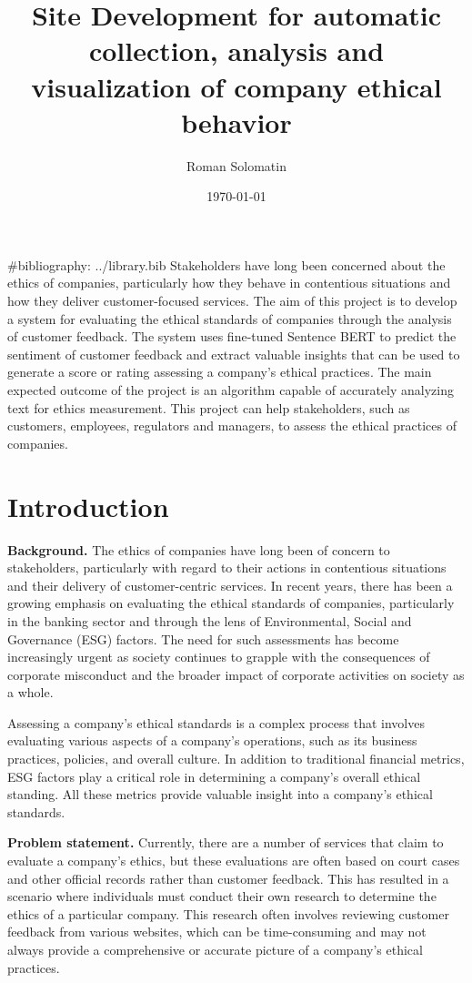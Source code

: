 \documentclass[PI]{ProjectProposal}
\author{Roman Solomatin}
\date{\today}
\title{Site Development for automatic collection, analysis and visualization of company ethical behavior}
\begin{document}
\maketitle
\#bibliography: ../library.bib
Stakeholders have long been concerned about the ethics of companies, particularly how they behave in contentious situations and how they deliver customer-focused services. The aim of this project is to develop a system for evaluating the ethical standards of companies through the analysis of customer feedback. The system uses fine-tuned Sentence BERT to predict the sentiment of customer feedback and extract valuable insights that can be used to generate a score or rating assessing a company's ethical practices. The main expected outcome of the project is an algorithm capable of accurately analyzing text for ethics measurement. This project can help stakeholders, such as customers, employees, regulators and managers, to assess the ethical practices of companies.

\chapter{Introduction}
\label{sec:orga20f02b}
\textbf{Background.} The ethics of companies have long been of concern to stakeholders, particularly with regard to their actions in contentious situations and their delivery of customer-centric services. In recent years, there has been a growing emphasis on evaluating the ethical standards of companies, particularly in the banking sector and through the lens of Environmental, Social and Governance (ESG) factors\autocites{mure_esg_2021}[][]{miralles-quiros_esg_2019}[][]{climent_ethical_2018}. The need for such assessments has become increasingly urgent as society continues to grapple with the consequences of corporate misconduct and the broader impact of corporate activities on society as a whole.

Assessing a company's ethical standards is a complex process that involves evaluating various aspects of a company's operations, such as its business practices, policies, and overall culture. In addition to traditional financial metrics, ESG factors play a critical role in determining a company's overall ethical standing. All these metrics provide valuable insight into a company's ethical standards.

\textbf{Problem statement.} Currently, there are a number of services that claim to evaluate a company's ethics, but these evaluations are often based on court cases and other official records rather than customer feedback. This has resulted in a scenario where individuals must conduct their own research to determine the ethics of a particular company. This research often involves reviewing customer feedback from various websites, which can be time-consuming and may not always provide a comprehensive or accurate picture of a company's ethical practices.
\end{document}
